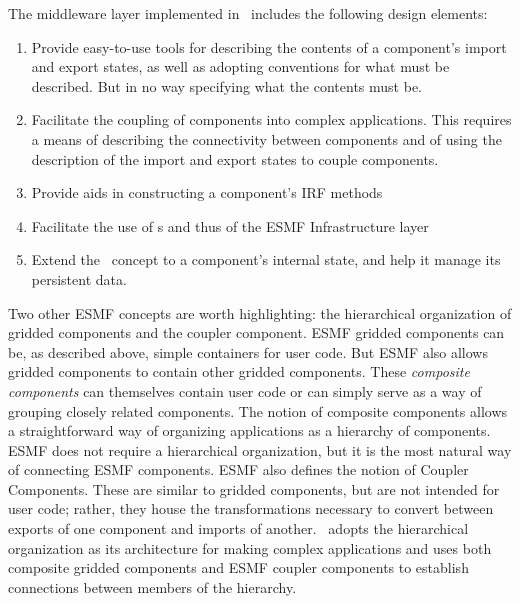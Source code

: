 The middleware layer implemented in \ggn\  
includes the following design elements:

\begin{enumerate}

\item Provide easy-to-use tools for describing the contents of a
component's import and export states, as well as adopting conventions for what
must be described. But in no way specifying what the contents must be.

\item Facilitate the coupling of components into complex applications. This
requires a means of describing the connectivity between components and
of using the description of the import and export states to couple
components.

\item Provide aids in constructing a component's IRF methods

\item Facilitate the use of \fld s and thus of the ESMF 
Infrastructure layer

\item Extend the \stt\  concept to a component's internal state, and
help it manage its persistent data.  

\end{enumerate}



Two other ESMF concepts are worth highlighting: the hierarchical
organization of gridded components and the coupler component.
ESMF gridded components can be, as described above, simple containers
for user code. But ESMF also allows gridded components to contain
other gridded components. These {\em composite
components} can themselves contain user code or can simply serve
as a way of grouping closely related components. The notion of
composite components allows a straightforward way of organizing
applications as a hierarchy of components. ESMF does not
require a hierarchical organization, but it
is the most natural way of connecting ESMF components. 
ESMF also defines the notion of
Coupler Components. These are similar to gridded components, but are
not intended for user code; rather, they house the transformations
necessary to convert between exports of one component and imports of
another. \ggn\  adopts the hierarchical organization as its architecture
for making complex applications and uses both composite gridded components
 and ESMF coupler components to establish connections between 
members of the hierarchy.


